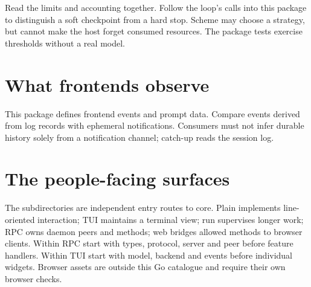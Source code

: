 Read the limits and accounting together. Follow the loop's calls into this package to distinguish a soft checkpoint from a hard stop. Scheme may choose a strategy, but cannot make the host forget consumed resources. The package tests exercise thresholds without a real model.



\chapter{What frontends observe}

This package defines frontend events and prompt data. Compare events derived from log records with ephemeral notifications. Consumers must not infer durable history solely from a notification channel; catch-up reads the session log.


\chapter{The people-facing surfaces}

The subdirectories are independent entry routes to core. Plain implements line-oriented interaction; TUI maintains a terminal view; run supervises longer work; RPC owns daemon peers and methods; web bridges allowed methods to browser clients. Within RPC start with types, protocol, server and peer before feature handlers. Within TUI start with model, backend and events before individual widgets. Browser assets are outside this Go catalogue and require their own browser checks.










